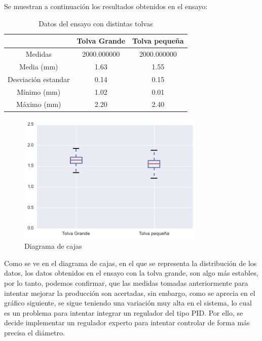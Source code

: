 Se muestran a continuación los resultados obtenidos en el ensayo:

\begin{table}[H]
    \centering
    \begin{tabular}{ccc}
                            & Tolva Grande & Tolva pequeña \\ \hline
        Medidas               & 2000.000000  & 2000.000000   \\
        Media (mm)          & 1.63     & 1.55      \\
        Desviación estandar & 0.14     & 0.15      \\
        Mínimo (mm)             & 1.02     & 0.01      \\
        Máximo (mm)             & 2.20     & 2.40     
    \end{tabular}
    \caption{Datos del ensayo con distintas tolvas}
    \label{tab:ensa_tolvas}
\end{table}

\begin{figure}[H]
    \centering
    \includegraphics[width=0.8\textwidth]{images/producciones/22072015/output_6_1.png}
    \caption{Diagrama de cajas }
    \label{fig:22072015-boxplot}
\end{figure}

Como se ve en el diagrama de cajas, en el que se representa la distribución de los datos, los datos obtenidos en el ensayo con la tolva grande, son algo más estables, por lo tanto, podemos confirmar, que las medidas tomadas anteriormente para intentar mejorar la producción son acertadas, sin embargo, como se aprecia en el gráfico siguiente, se sigue teniendo una variación muy alta en el sistema, lo cual es un problema para intentar integrar un regulador del tipo PID. Por ello, se decide implementar un regulador experto para intentar controlar de forma más precisa el diámetro.

